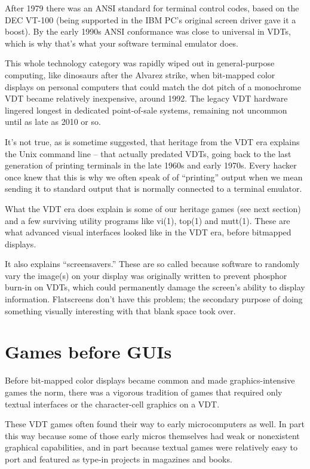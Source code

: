 \documentclass[10pt,twoside,openright]{memoir}
\begin{document}
After 1979 there was an ANSI standard for terminal control codes, based on the DEC VT-100 (being supported in the IBM PC's original screen driver gave it a boost). By the early 1990s ANSI conformance was close to universal in VDTs, which is why that's what your software terminal emulator does.

This whole technology category was rapidly wiped out in general-purpose computing, like dinosaurs after the Alvarez strike, when bit-mapped color displays on personal computers that could match the dot pitch of a monochrome VDT became relatively inexpensive, around 1992. The legacy VDT hardware lingered longest in dedicated point-of-sale systems, remaining not uncommon until as late as 2010 or so.

It's not true, as is sometime suggested, that heritage from the VDT era explains the Unix command line -- that actually predated VDTs, going back to the last generation of printing terminals in the late 1960s and early 1970s. Every hacker once knew that this is why we often speak of of ``printing'' output when we mean sending it to standard output that is normally connected to a terminal emulator.

What the VDT era does explain is some of our heritage games (see next section) and a few surviving utility programs like vi(1), top(1) and mutt(1). These are what advanced visual interfaces looked like in the VDT era, before bitmapped displays.

It also explains ``screensavers.'' These are so called because software to randomly vary the image(s) on your display was originally written to prevent phosphor burn-in on VDTs, which could permanently damage the screen's ability to display information. Flatscreens don't have this problem; the secondary purpose of doing something visually interesting with that blank space took over.

\section{Games before GUIs}

Before bit-mapped color displays became common and made graphics-intensive games the norm, there was a vigorous tradition of games that required only textual interfaces or the character-cell graphics on a VDT.

These VDT games often found their way to early microcomputers as well. In part this way because some of those early micros themselves had weak or nonexistent graphical capabilities, and in part because textual games were relatively easy to port and featured as type-in projects in magazines and books.
\end{document}
